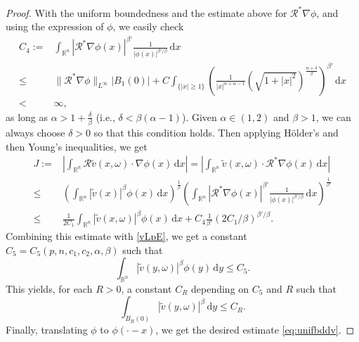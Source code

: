 \documentclass[11pt,reqno]{amsart}
\theoremstyle{definition}
\theoremstyle{remark}
\numberwithin{equation}{section}
\def\upd{\mathrm{d}}
\newcommand{\R}{{\mathbb{R}}}
\newcommand{\dd}{\mathrm{d}}
\begin{document}
\begin{proof}
With the uniform boundedness and the estimate above for $\mathcal{R}^*\nabla \phi$, and using the expression of $\phi$, we easily check
\begin{equation*}
\begin{aligned}
    C_4 := &\int_{\R^n} \left|\mathcal{R}^*\nabla \phi(x)\right|^{\beta'} \frac{1}{|\phi(x)|^{\beta'/\beta}}\,\dd x\\
    \le & \|\mathcal{R}^*\nabla \phi\|_{L^\infty}|B_1(0)| + C\int_{\{|x|\ge 1\}} \left(\frac{1}{|x|^{n+\alpha-1}} (\sqrt{1+|x|^2})^{\frac{n+\delta}\beta}\right)^{\beta'}\,\dd x\\
    < &\infty,
    \end{aligned}
\end{equation*}
as long as $\alpha > 1+\frac{\delta}{\beta}$ (i.e., $\delta < \beta(\alpha-1)$). Given $\alpha \in (1,2)$ and $\beta >1$, we can always choose $\delta>0$ so that this condition holds. Then applying H\"older's and then Young's inequalities, we get
\begin{equation*}
\begin{aligned}
    J := &\left|\int_{\mathbb{R}^n}  \mathcal{R} \widetilde v (x,\omega)\cdot \nabla \phi(x)\,\mathrm{d}x\right| = \left|\int_{\mathbb{R}^n} \widetilde v (x,\omega)\cdot \mathcal{R}^*\nabla \phi(x)\,\mathrm{d}x\right|\\
    \le & \left(\int_{\R^n} |\widetilde v(x)|^\beta \phi(x)\,\dd x\right)^{\frac1{\beta}}\left(\int_{\R^n} |\mathcal{R}^*\nabla \phi(x)|^{\beta'} \frac{1}{|\phi(x)|^{\beta'/\beta}}\,\dd x\right)^{\frac{1}{\beta'}}\\
    \le &\frac{1}{2C_1} \int_{\R^n}|\widetilde v(x,\omega)|^\beta \phi(x)\,\upd x + C_4\frac{1}{\beta'}(2C_1/\beta)^{\beta'/\beta}.
    \end{aligned}
\end{equation*}
Combining this estimate with \eqref{vLpE}, we get a constant $C_5=C_5(p,n,c_1,c_2,\alpha,\beta)$ such that
\begin{equation}
    \int_{\R^n} |\widetilde{v}(y,\omega)|^\beta \phi(y)\,\dd y \le C_5.
\end{equation}
This yields, for each $R>0$, a constant $C_R$ depending on $C_5$ and $R$ such that
\begin{equation*}
    \int_{B_R(0)} |\widetilde{v}(y,\omega)|^\beta \,\dd y \le C_R.
\end{equation*}
Finally, translating $\phi$ to $\phi(\cdot -x)$, we get the desired estimate \eqref{eq:unifbddv}.

\medskip


\end{proof}
\end{document}
